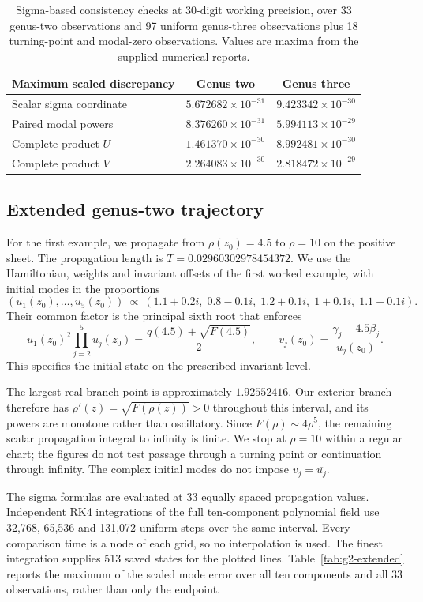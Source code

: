 \documentclass[11pt]{article}
\begin{document}
\begin{table}[htbp]
\centering\small
\begin{tabular}{lcc}\toprule
Maximum scaled discrepancy & Genus two & Genus three\\\midrule
Scalar sigma coordinate & $5.672682\times10^{-31}$ & $9.423342\times10^{-30}$\\
Paired modal powers & $8.376260\times10^{-31}$ & $5.994113\times10^{-29}$\\
Complete product $U$ & $1.461370\times10^{-30}$ & $8.992481\times10^{-30}$\\
Complete product $V$ & $2.264083\times10^{-30}$ & $2.818472\times10^{-29}$\\
\bottomrule\end{tabular}
\caption{Sigma-based consistency checks at 30-digit working precision, over 33 genus-two observations and 97 uniform genus-three observations plus 18 turning-point and modal-zero observations. Values are maxima from the supplied numerical reports.}\label{tab:analytic-checks}
\end{table}

\subsection{Extended genus-two trajectory}

For the first example, we propagate from $\rho(z_0)=4.5$ to $\rho=10$ on the positive sheet. The propagation length is $T=0.02960302978454372$. We use the Hamiltonian, weights and invariant offsets of the first worked example, with initial modes in the proportions
\[
(u_1(z_0),\ldots,u_5(z_0))\ \propto\
(1.1+0.2i,\;0.8-0.1i,\;1.2+0.1i,\;1+0.1i,\;1.1+0.1i).
\]
Their common factor is the principal sixth root that enforces
\[
u_1(z_0)^2\prod_{j=2}^5u_j(z_0)=\frac{q(4.5)+\sqrt{F(4.5)}}2,\qquad
v_j(z_0)=\frac{\gamma_j-4.5\beta_j}{u_j(z_0)}.
\]
This specifies the initial state on the prescribed invariant level.

The largest real branch point is approximately $1.92552416$. Our exterior branch therefore has $\rho'(z)=\sqrt{F(\rho(z))}>0$ throughout this interval, and its powers are monotone rather than oscillatory. Since $F(\rho)\sim4\rho^5$, the remaining scalar propagation integral to infinity is finite. We stop at $\rho=10$ within a regular chart; the figures do not test passage through a turning point or continuation through infinity. The complex initial modes do not impose $v_j=\overline{u_j}$.

The sigma formulas are evaluated at 33 equally spaced propagation values. Independent RK4 integrations of the full ten-component polynomial field use 32,768, 65,536 and 131,072 uniform steps over the same interval. Every comparison time is a node of each grid, so no interpolation is used. The finest integration supplies 513 saved states for the plotted lines. Table~\ref{tab:g2-extended} reports the maximum of the scaled mode error over all ten components and all 33 observations, rather than only the endpoint.
\end{document}

